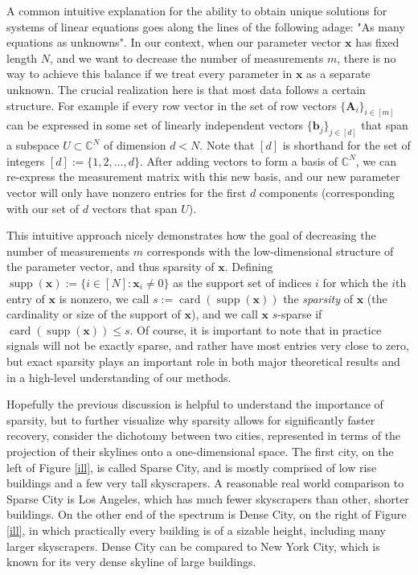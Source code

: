 \documentclass[12pt,a4paper]{amsart}
\numberwithin{equation}{section}
\theoremstyle{plain}
\theoremstyle{definition}
\newcommand{\BC}{\mathbb C}
\newcommand{\bdx}{\mathbf{x}}
\newcommand{\bdb}{\mathbf{b}}
\newcommand{\bdA}{\mathbf{A}}
\DeclareMathOperator{\card}{card}
\DeclareMathOperator{\supp}{supp}
\begin{document}
A common intuitive explanation for the ability to obtain unique solutions for systems of linear equations goes along the lines of the following adage: "As many equations as unknowns". In our context, when our parameter vector $\bdx$ has fixed length $N$, and we want to decrease the number of measurements $m$, there is no way to achieve this balance if we treat every parameter in $\bdx$ as a separate unknown. The crucial realization here is that most data follows a certain structure. For example if every row vector in the set of row vectors $\{\bdA_i\}_{i\in[m]}$ can be expressed in some set of linearly independent vectors $\{\bdb_j\}_{j\in[d]}$ that span a subspace $U\subset\BC^N$ of dimension $d<N$. Note that $[d]$ is shorthand for the set of integers $[d]:=\{1,2,...,d\}$. After adding vectors to form a basis of $\BC^N$, we can re-express the measurement matrix with this new basis, and our new parameter vector will only have nonzero entries for the first $d$ components (corresponding with our set of $d$ vectors that span $U$).

This intuitive approach nicely demonstrates how the goal of decreasing the number of measurements $m$ corresponds with the low-dimensional structure of the parameter vector, and thus sparsity of $\bdx$. Defining $\supp(\bdx):=\{i\in[N]:\bdx_i\neq0\}$ as the support set of indices $i$ for which the $i$th entry of $\bdx$ is nonzero, we call $s:=\card(\supp(\bdx))$ the \textit{sparsity} of $\bdx$ (the cardinality or size of the support of $\bdx$), and we call $\bdx$ $s$-sparse if $\card(\supp(\bdx))\leq s$. Of course, it is important to note that in practice signals will not be exactly sparse, and rather have most entries very close to zero, but exact sparsity plays an important role in both major theoretical results and in a high-level understanding of our methods.


Hopefully the previous discussion is helpful to understand the importance of sparsity, but to further visualize why sparsity allows for significantly faster recovery, consider the dichotomy between two cities, represented in terms of the projection of their skylines onto a one-dimensional space. The first city, on the left of Figure \ref{ill}, is called Sparse City, and is mostly comprised of low rise buildings and a few very tall skyscrapers. A reasonable real world comparison to Sparse City is Los Angeles, which has much fewer skyscrapers than other, shorter buildings. On the other end of the spectrum is Dense City, on the right of Figure \ref{ill}, in which practically every building is of a sizable height, including many larger skyscrapers. Dense City can be compared to New York City, which is known for its very dense skyline of large buildings.
\end{document}
